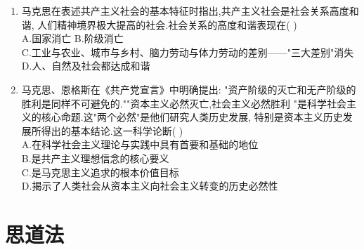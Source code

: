 \documentclass[12pt, a4paper, oneside, UTF8]{ctexbook}
\begin{document}
\begin{enumerate}
    \item 马克思在表述共产主义社会的基本特征时指出,共产主义社会是社会关系高度和谐,
    人们精神境界极大提高的社会.社会关系的高度和谐表现在(   ) \\
    A.国家消亡\qquad
    B.阶级消亡 \\
    C.工业与农业、城市与乡村、脑力劳动与体力劳动的差别——"三大差别"消失 \\
    D.人、自然及社会都达成和谐 

    \item 马克思、恩格斯在《共产党宣言》中明确提出:
    "资产阶级的灭亡和无产阶级的胜利是同样不可避免的.""资本主义必然灭亡,社会主义必然胜利
    "是科学社会主义的核心命题.这"两个必然"是他们研究人类历史发展,
    特别是资本主义历史发展所得出的基本结论.这一科学论断(   ) \\
    A.在科学社会主义理论与实践中具有首要和基础的地位 \\
    B.是共产主义理想信念的核心要义\\
    C.是马克思主义追求的根本价值目标\\
    D.揭示了人类社会从资本主义向社会主义转变的历史必然性
\end{enumerate}
\section{思道法} 
\end{document}
